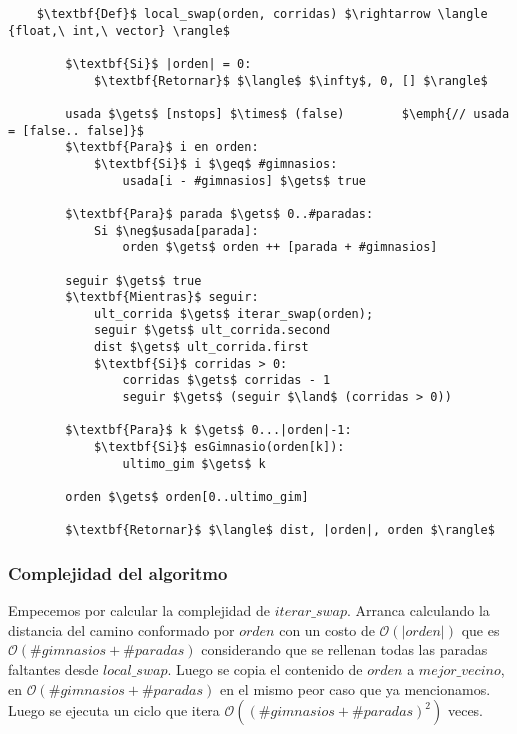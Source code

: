     \begin{lstlisting}
    $\textbf{Def}$ local_swap(orden, corridas) $\rightarrow \langle {float,\ int,\ vector} \rangle$

        $\textbf{Si}$ |orden| = 0:
            $\textbf{Retornar}$ $\langle$ $\infty$, 0, [] $\rangle$

        usada $\gets$ [nstops] $\times$ (false)        $\emph{// usada = [false.. false]}$
        $\textbf{Para}$ i en orden:
            $\textbf{Si}$ i $\geq$ #gimnasios:
                usada[i - #gimnasios] $\gets$ true

        $\textbf{Para}$ parada $\gets$ 0..#paradas:
            Si $\neg$usada[parada]:
                orden $\gets$ orden ++ [parada + #gimnasios]

        seguir $\gets$ true
        $\textbf{Mientras}$ seguir:
            ult_corrida $\gets$ iterar_swap(orden);
            seguir $\gets$ ult_corrida.second
            dist $\gets$ ult_corrida.first
            $\textbf{Si}$ corridas > 0:
                corridas $\gets$ corridas - 1
                seguir $\gets$ (seguir $\land$ (corridas > 0))

        $\textbf{Para}$ k $\gets$ 0...|orden|-1:
            $\textbf{Si}$ esGimnasio(orden[k]):
                ultimo_gim $\gets$ k

        orden $\gets$ orden[0..ultimo_gim]

        $\textbf{Retornar}$ $\langle$ dist, |orden|, orden $\rangle$
    \end{lstlisting}

\subsubsection{Complejidad del algoritmo}
    Empecemos por calcular la complejidad de $iterar\_swap$. Arranca calculando la distancia del camino conformado por $orden$ con un costo de $\mathcal{O}(|orden|)$ que es $\mathcal{O}(\#gimnasios + \#paradas)$ considerando que se rellenan todas las paradas faltantes desde $local\_swap$. Luego se copia el contenido de $orden$ a $mejor\_vecino$, en $\mathcal{O}(\#gimnasios + \#paradas)$ en el mismo peor caso que ya mencionamos.
    \\

    Luego se ejecuta un ciclo que itera $\mathcal{O}((\#gimnasios + \#paradas)^2)$ veces.
    \\

